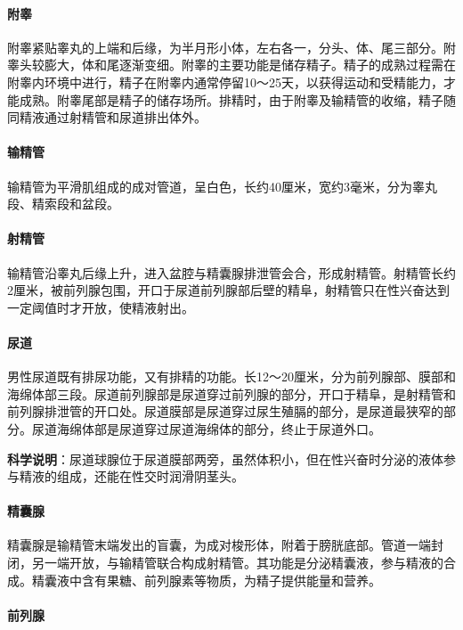 \paragraph{附睾}

附睾紧贴睾丸的上端和后缘，为半月形小体，左右各一，分头、体、尾三部分。附睾头较膨大，体和尾逐渐变细。附睾的主要功能是储存精子。精子的成熟过程需在附睾内环境中进行，精子在附睾内通常停留10～25天，以获得运动和受精能力，才能成熟。附睾尾部是精子的储存场所。排精时，由于附睾及输精管的收缩，精子随同精液通过射精管和尿道排出体外。

\paragraph{输精管}

输精管为平滑肌组成的成对管道，呈白色，长约40厘米，宽约3毫米，分为睾丸段、精索段和盆段。

\paragraph{射精管}

输精管沿睾丸后缘上升，进入盆腔与精囊腺排泄管会合，形成射精管。射精管长约2厘米，被前列腺包围，开口于尿道前列腺部后壁的精阜，射精管只在性兴奋达到一定阈值时才开放，使精液射出。

\paragraph{尿道}

男性尿道既有排尿功能，又有排精的功能。长12～20厘米，分为前列腺部、膜部和海绵体部三段。尿道前列腺部是尿道穿过前列腺的部分，开口于精阜，是射精管和前列腺排泄管的开口处。尿道膜部是尿道穿过尿生殖膈的部分，是尿道最狭窄的部分。尿道海绵体部是尿道穿过尿道海绵体的部分，终止于尿道外口。

\textbf{科学说明}：尿道球腺位于尿道膜部两旁，虽然体积小，但在性兴奋时分泌的液体参与精液的组成，还能在性交时润滑阴茎头。

\paragraph{精囊腺}

精囊腺是输精管末端发出的盲囊，为成对梭形体，附着于膀胱底部。管道一端封闭，另一端开放，与输精管联合构成射精管。其功能是分泌精囊液，参与精液的合成。精囊液中含有果糖、前列腺素等物质，为精子提供能量和营养。

\paragraph{前列腺}

